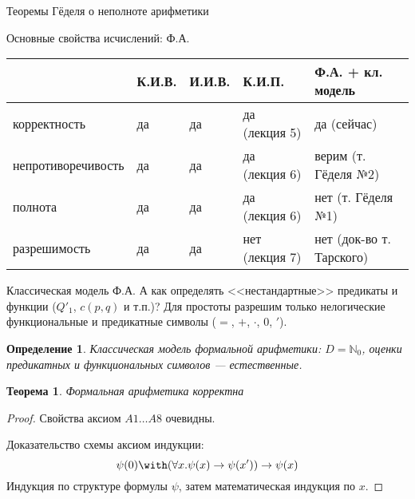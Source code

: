 \documentclass[aspectratio=169]{beamer}
\newtheorem{thm}{Теорема}[section]
\newtheorem{dfn}{Определение}[section]
\begin{document}
\newcommand\doubleplus{+\kern-1.3ex+\kern0.8ex}
\newcommand\mdoubleplus{\ensuremath{\mathbin{+\mkern-10mu+}}}

\begin{frame}{}
\LARGE\begin{center}Теоремы Гёделя о неполноте арифметики\end{center}
\end{frame}

\begin{frame}{Основные свойства исчислений: Ф.А.}
\begin{tabular}{lllll}
      & К.И.В. & И.И.В. & К.И.П. & Ф.А. + кл. модель\\\hline
корректность & да  & да  & да (лекция 5) & да (сейчас)\\
непротиворечивость & да  & да  & да (лекция 6) & {\color{red}верим} (т. Гёделя №2)\\
полнота & да & да & да (лекция 6) & {\color{red}нет} (т. Гёделя №1)\\
разрешимость & да  & да & нет (лекция 7)& {\color{red}нет} (док-во т. Тарского)
\end{tabular}
\end{frame}

\begin{frame}{Классическая модель Ф.А.}
А как определять <<нестандартные>> предикаты и функции ($Q'_1$, $c(p,q)$ и т.п.)? \pause
Для простоты разрешим только нелогические функциональные и предикатные символы ($=$, $+$, $\cdot$, 0, $'$).\pause
\begin{dfn}Классическая модель формальной арифметики: $D = \mathbb{N}_0$, оценки предикатных и функциональных символов 
--- естественные.
\end{dfn}

\begin{thm}Формальная арифметика корректна\end{thm}
\begin{proof}Свойства аксиом $A1\dots A8$ очевидны. 

Доказательство схемы аксиом индукции:
$$\psi(0) \with (\forall x.\psi(x) \rightarrow \psi(x')) \rightarrow \psi(x)$$
Индукция по структуре формулы $\psi$, затем математическая индукция по $x$.
\end{proof}
\end{frame}
\end{document}
